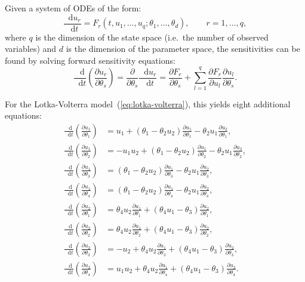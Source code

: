 \documentclass[11pt,a4paper]{report}
\newcommand*\diff{\mathop{}\!\mathrm{d}}
\begin{document}
Given a system of ODEs of the form:
$$\frac{\diff u_r}{\diff t} = F_r(t, u_1, \dots, u_q; \theta_1, \dots, \theta_d),\qquad r=1,\dots,q,$$
where $q$ is the dimension of the state space (i.e.\ the number of observed variables) and $d$ is the dimension of the parameter space,
the sensitivities can be found by solving forward sensitivity equations:
$$\frac{\diff}{\diff t}\left(\frac{\partial u_r}{\partial \theta_s}\right)
= \frac{\partial}{\partial \theta_s}\frac{\diff u_r}{\diff t} 
= \frac{\partial F_r}{\partial \theta_s} + \sum_{l=1}^q \frac{\partial F_r}{\partial u_l} \frac{\partial u_l}{\partial \theta_s}.$$

For the Lotka-Volterra model~(\ref{eq:lotka-volterra}), this yields eight additional equations:
\begin{equation*}
\begin{aligned}
\frac{\diff}{\diff t}\left(\frac{\partial u_1}{\partial \theta_1}\right) &= u_1 + (\theta_1 - \theta_2 u_2) \frac{\partial u_1}{\partial \theta_1} - \theta_2 u_1 \frac{\partial u_2}{\partial \theta_1}, \\
\frac{\diff}{\diff t}\left(\frac{\partial u_1}{\partial \theta_2}\right) &= - u_1 u_2 + (\theta_1 - \theta_2 u_2) \frac{\partial u_1}{\partial \theta_2} - \theta_2 u_1 \frac{\partial u_2}{\partial \theta_2}, \\
\frac{\diff}{\diff t}\left(\frac{\partial u_1}{\partial \theta_3}\right) &= (\theta_1 - \theta_2 u_2) \frac{\partial u_1}{\partial \theta_3} - \theta_2 u_1 \frac{\partial u_2}{\partial \theta_3}, \\
\frac{\diff}{\diff t}\left(\frac{\partial u_1}{\partial \theta_4}\right) &= (\theta_1 - \theta_2 u_2) \frac{\partial u_1}{\partial \theta_4} - \theta_2 u_1 \frac{\partial u_2}{\partial \theta_4}, \\
\frac{\diff}{\diff t}\left(\frac{\partial u_2}{\partial \theta_1}\right) &= \theta_4 u_2 \frac{\partial u_1}{\partial \theta_1} + (\theta_4 u_1 - \theta_3) \frac{\partial u_2}{\partial \theta_1}, \\
\frac{\diff}{\diff t}\left(\frac{\partial u_2}{\partial \theta_2}\right) &= \theta_4 u_2 \frac{\partial u_1}{\partial \theta_2} + (\theta_4 u_1 - \theta_3) \frac{\partial u_2}{\partial \theta_2}, \\
\frac{\diff}{\diff t}\left(\frac{\partial u_2}{\partial \theta_3}\right) &= -u_2 + \theta_4 u_2 \frac{\partial u_1}{\partial \theta_3} + (\theta_4 u_1 - \theta_3) \frac{\partial u_2}{\partial \theta_3}, \\
\frac{\diff}{\diff t}\left(\frac{\partial u_2}{\partial \theta_4}\right) &= u_1 u_2 + \theta_4 u_2 \frac{\partial u_1}{\partial \theta_4} + (\theta_4 u_1 - \theta_3) \frac{\partial u_2}{\partial \theta_4}. \\
\end{aligned}
\end{equation*}
\end{document}
